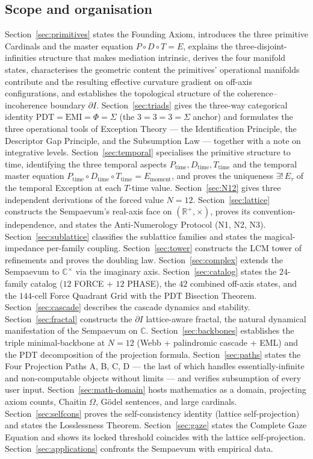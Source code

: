 \documentclass[11pt,a4paper]{article}
\theoremstyle{definition}
\theoremstyle{remark}
\newcommand{\R}{\mathbb{R}}
\newcommand{\C}{\mathbb{C}}
\begin{document}
\subsection{Scope and organisation}

Section~\ref{sec:primitives} states the Founding Axiom, introduces the three primitive Cardinals and the master equation $P\circ D\circ T = E$, explains the three-disjoint-infinities structure that makes mediation intrinsic, derives the four manifold states, characterises the geometric content the primitives' operational manifolds contribute and the resulting effective curvature gradient on off-axis configurations, and establishes the topological structure of the coherence--incoherence boundary $\partial I$. Section~\ref{sec:triads} gives the three-way categorical identity $\mathrm{PDT} = \mathrm{EMI} = \Phi = \Sigma$ (the $3=3=3=\Sigma$ anchor) and formulates the three operational tools of Exception Theory --- the Identification Principle, the Descriptor Gap Principle, and the Subsumption Law --- together with a note on integrative levels. Section~\ref{sec:temporal} specialises the primitive structure to time, identifying the three temporal aspects $P_{\text{time}}, D_{\text{time}}, T_{\text{time}}$ and the temporal master equation $P_{\text{time}} \circ D_{\text{time}} \circ T_{\text{time}} = E_{\text{moment}}$, and proves the uniqueness $\exists!\,E_{\tau}$ of the temporal Exception at each $T$-time value. Section~\ref{sec:N12} gives three independent derivations of the forced value $N=12$. Section~\ref{sec:lattice} constructs the Sempaevum's real-axis face on $(\R^{+},\times)$, proves its convention-independence, and states the Anti-Numerology Protocol (N1, N2, N3). Section~\ref{sec:sublattice} classifies the sublattice families and states the magical-impedance per-family coupling. Section~\ref{sec:tower} constructs the LCM tower of refinements and proves the doubling law. Section~\ref{sec:complex} extends the Sempaevum to $\C^{\times}$ via the imaginary axis. Section~\ref{sec:catalog} states the $24$-family catalog ($12$ FORCE $+$ $12$ PHASE), the $42$ combined off-axis states, and the $144$-cell Force Quadrant Grid with the PDT Bisection Theorem. Section~\ref{sec:cascade} describes the cascade dynamics and stability. Section~\ref{sec:fractal} constructs the $\partial I$ lattice-aware fractal, the natural dynamical manifestation of the Sempaevum on $\C$. Section~\ref{sec:backbones} establishes the triple minimal-backbone at $N=12$ (Webb + palindromic cascade + EML) and the PDT decomposition of the projection formula. Section~\ref{sec:paths} states the Four Projection Paths A, B, C, D --- the last of which handles essentially-infinite and non-computable objects without limits --- and verifies subsumption of every user input. Section~\ref{sec:math-domain} hosts mathematics as a domain, projecting axiom counts, Chaitin $\Omega$, G\"odel sentences, and large cardinals. Section~\ref{sec:selfcons} proves the self-consistency identity (lattice self-projection) and states the Losslessness Theorem. Section~\ref{sec:gaze} states the Complete Gaze Equation and shows its locked threshold coincides with the lattice self-projection. Section~\ref{sec:applications} confronts the Sempaevum with empirical data. 
\end{document}
